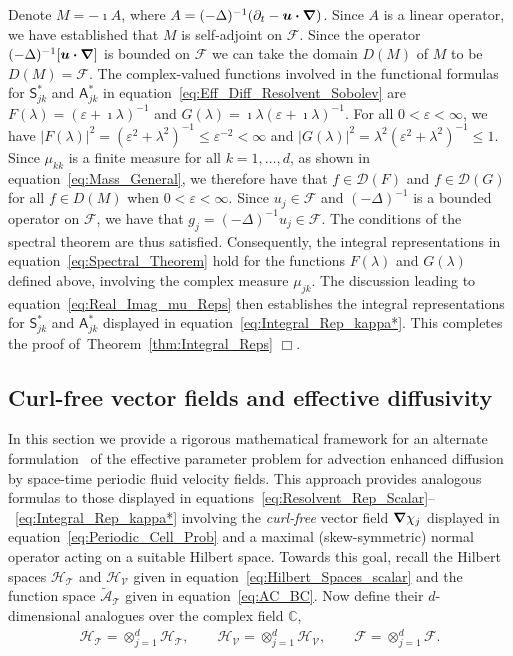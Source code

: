 \documentclass[leqno,onefignum,onetabnum]{siamltex1213}
\newcommand{\thmref}[1]{Theorem~\ref{#1}}
\newcommand{\Tc}{\mathcal{T}}
\newcommand{\Vc}{\mathcal{V}}
\newcommand{\Hc}{\mathcal{H}}
\newcommand{\Fc}{\mathcal{F}}
\newcommand{\Sm}{\mathsf{S}}
\newcommand{\Am}{\mathsf{A}}
\newcommand{\Hs}{\mathscr{H}}
\newcommand{\As}{\mathscr{A}}
\newcommand{\Ds}{\mathscr{D}}
\newcommand{\Fs}{\mathscr{F}}
\newcommand\bnabla{\mbox{\boldmath${\nabla}$}}
\providecommand\bcdot{\boldsymbol{\cdot}}
\newcommand{\vecu}{\boldsymbol{u}}
\begin{document}
Denote $M=-\imath A$, where $A=(-\Delta)^{-1}(\partial_t-\vecu\bcdot\bnabla)$. Since
$A$ is a linear operator, 
we have established that $M$ is
self-adjoint on $\Fs$. Since the operator 
$(-\Delta)^{-1}[\vecu\bcdot\bnabla]$ is bounded on $\Fs$ we can take the
domain $D(M)$ of $M$ to be $D(M)=\Fs$. The complex-valued functions
involved in the functional formulas for $\Sm^*_{jk}$ and $\Am^*_{jk}$
in equation~\eqref{eq:Eff_Diff_Resolvent_Sobolev} are $F(\lambda)=(\varepsilon+\imath\lambda)^{-1}$ 
and $G(\lambda)=\imath\lambda(\varepsilon+\imath\lambda)^{-1}$. For all $0<\varepsilon<\infty$,
we have $|F(\lambda)|^2=(\varepsilon^2+\lambda^2)^{-1}\leq\varepsilon^{-2}<\infty$ and 
$|G(\lambda)|^2=\lambda^2(\varepsilon^2+\lambda^2)^{-1}\leq 1$. Since $\mu_{kk}$ is a finite measure
for all $k=1,\ldots,d$, as shown in equation~\eqref{eq:Mass_General}, we
therefore have 
that $f\in\Ds(F)$ and $f\in\Ds(G)$ for all $f\in D(M)$ when $0<\varepsilon<\infty$. Since $u_j\in\Fs$ and $(-\Delta)^{-1}$ is a bounded operator on $\Fs$, we have that 
$g_j=(-\Delta)^{-1}u_j\in\Fs$. The conditions of the spectral theorem are
thus satisfied. Consequently, the integral representations in
equation~\eqref{eq:Spectral_Theorem} hold for the functions $F(\lambda)$ and
$G(\lambda)$ defined above, involving the complex measure $\mu_{jk}$. The
discussion leading to equation~\eqref{eq:Real_Imag_mu_Reps} then
establishes the integral representations for $\Sm^*_{jk}$ and
$\Am^*_{jk}$ displayed in equation~\eqref{eq:Integral_Rep_kappa*}.
This completes the proof of~\thmref{thm:Integral_Reps} $\Box$. 






\subsection{Curl-free vector fields and effective diffusivity}
\label{sec:Curl_Free_Fields}
%
In this section we provide a rigorous mathematical framework for an
alternate formulation~\cite{Avellaneda:PRE:3249} of the effective
parameter problem for advection enhanced diffusion by space-time
periodic fluid velocity fields.  This approach provides analogous
formulas to those displayed in
equations~\eqref{eq:Resolvent_Rep_Scalar}--~\eqref{eq:Integral_Rep_kappa*}
involving the \emph{curl-free} vector field $\bnabla\chi_j$ displayed in
equation~\eqref{eq:Periodic_Cell_Prob} and a maximal (skew-symmetric)
normal operator acting on a suitable Hilbert space. Towards this goal,
recall the Hilbert spaces $\Hs_{\Tc}$ and $\Hs_{\Vc}$ given in
equation~\eqref{eq:Hilbert_Spaces_scalar} and the function space
$\tilde{\As}_{\Tc}$ given in equation~\eqref{eq:AC_BC}. Now define
their $d$-dimensional analogues over the complex field $\mathbb{C}$,  
%
\begin{align}\label{eq:Hilbert_Spaces_vector}
  \Hc_{\Tc}=\otimes_{j=1}^d\Hs_{\Tc}, \qquad
  \Hc_{\Vc}=\otimes_{j=1}^d\Hs_{\Vc}, \qquad
  \Fc=\otimes_{j=1}^d\Fs.
\end{align}
%
\end{document}
